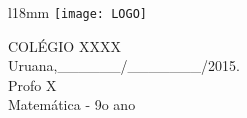 \begin{wrapfigure}[4]{l}{18mm}
\texttt{[image: LOGO]}
\end{wrapfigure}
\noindent
COLÉGIO XXXX \\
\noindent
Uruana,\_\_\_\_\_\_/\_\_\_\_\_\_\_/2015. \\
\noindent
Profo X \\
\noindent
Matemática - 9o ano
